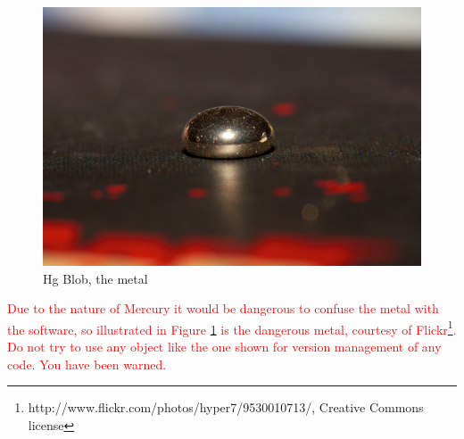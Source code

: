 \begin{figure}[h]

\includegraphics[width=\textwidth]{images/hg_blob_small.jpg}

\caption{Hg Blob, the metal}
\label{fig:hgblob}
\end{figure}

\textcolor{red}{Due to the nature of Mercury it would be dangerous to confuse the metal with the software, so illustrated in Figure \ref{fig:hgblob} is the dangerous metal, courtesy of Flickr\footnote{http://www.flickr.com/photos/hyper7/9530010713/, Creative Commons license}. Do not try to use any object like the one shown for version management of any code. You have been warned.}



